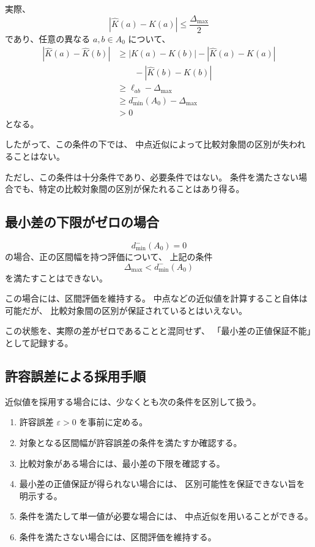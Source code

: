 \documentclass[a4paper,12pt]{article}
\begin{document}
実際、
\[
    |\widehat{K}(a)-K(a)|
    \leq\frac{\Delta_{\max}}{2}
\]
であり、任意の異なる $a,b\in A_0$ について、
\[
\begin{aligned}
    |\widehat{K}(a)-\widehat{K}(b)|
    &\geq |K(a)-K(b)|
       -|\widehat{K}(a)-K(a)|\\
    &\qquad
       -|\widehat{K}(b)-K(b)|\\
    &\geq \ell_{ab}-\Delta_{\max}\\
    &\geq d_{\min}^-(A_0)-\Delta_{\max}\\
    &>0
\end{aligned}
\]
となる。

したがって、この条件の下では、
中点近似によって比較対象間の区別が失われることはない。

ただし、この条件は十分条件であり、必要条件ではない。
条件を満たさない場合でも、特定の比較対象間の区別が保たれることはあり得る。

\subsection{最小差の下限がゼロの場合}

\[
    d_{\min}^-(A_0)=0
\]
の場合、正の区間幅を持つ評価について、
上記の条件
\[
    \Delta_{\max}<d_{\min}^-(A_0)
\]
を満たすことはできない。

この場合には、区間評価を維持する。
中点などの近似値を計算すること自体は可能だが、
比較対象間の区別が保証されているとはいえない。

この状態を、実際の差がゼロであることと混同せず、
「最小差の正値保証不能」として記録する。

\subsection{許容誤差による採用手順}

近似値を採用する場合には、少なくとも次の条件を区別して扱う。

\begin{enumerate}[label=(\arabic*)]
    \item 許容誤差 $\varepsilon>0$ を事前に定める。
    \item 対象となる区間幅が許容誤差の条件を満たすか確認する。
    \item 比較対象がある場合には、最小差の下限を確認する。
    \item 最小差の正値保証が得られない場合には、
    区別可能性を保証できない旨を明示する。
    \item 条件を満たして単一値が必要な場合には、
    中点近似を用いることができる。
    \item 条件を満たさない場合には、区間評価を維持する。
\end{enumerate}
\end{document}

